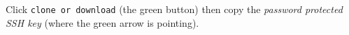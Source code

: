 \documentclass[
]{article}
\begin{document}
\begin{center}
\end{center}

Click \texttt{clone\ or\ download} (the green button) then copy the
\emph{password protected SSH key} (where the green arrow is pointing).

\begin{center}
\end{center}
\end{document}
